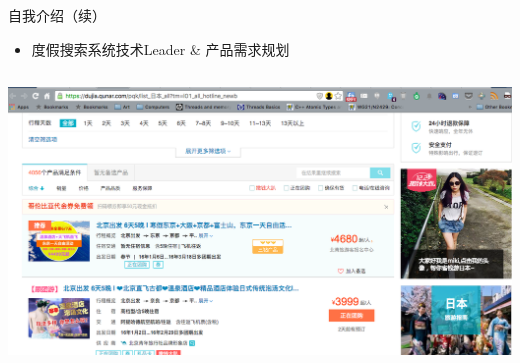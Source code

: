 \documentclass{beamer}
\begin{document}
\begin{CJK}{UTF8}{gbsn}
\begin{frame}{自我介绍（续）}
  \begin{itemize}
  \item {度假搜索系统技术Leader \& 产品需求规划}
  \end{itemize}
  \vspace{3 mm}
  \begin{columns}
    \includegraphics[scale=0.15]{./images/pc-search-screenshot}

\end{columns}
\end{frame}
\end{CJK}
\end{document}
